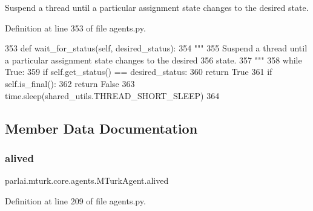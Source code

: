 \begin{DoxyVerb}Suspend a thread until a particular assignment state changes to the desired
state.
\end{DoxyVerb}
 

Definition at line 353 of file agents.\+py.


\begin{DoxyCode}
353     \textcolor{keyword}{def }wait\_for\_status(self, desired\_status):
354         \textcolor{stringliteral}{"""}
355 \textcolor{stringliteral}{        Suspend a thread until a particular assignment state changes to the desired}
356 \textcolor{stringliteral}{        state.}
357 \textcolor{stringliteral}{        """}
358         \textcolor{keywordflow}{while} \textcolor{keyword}{True}:
359             \textcolor{keywordflow}{if} self.get\_status() == desired\_status:
360                 \textcolor{keywordflow}{return} \textcolor{keyword}{True}
361             \textcolor{keywordflow}{if} self.is\_final():
362                 \textcolor{keywordflow}{return} \textcolor{keyword}{False}
363             time.sleep(shared\_utils.THREAD\_SHORT\_SLEEP)
364 
\end{DoxyCode}


\subsection{Member Data Documentation}
\mbox{\label{classparlai_1_1mturk_1_1core_1_1agents_1_1MTurkAgent_a97121ee3185b8a5e16da522d115035ca}} 
\subsubsection{\texorpdfstring{alived}{alived}}
{\footnotesize\ttfamily parlai.\+mturk.\+core.\+agents.\+M\+Turk\+Agent.\+alived}



Definition at line 209 of file agents.\+py.

\mbox{\label{classparlai_1_1mturk_1_1core_1_1agents_1_1MTurkAgent_a6e5052ac02e7a86225a5f4bdc9d49e2d}} 
